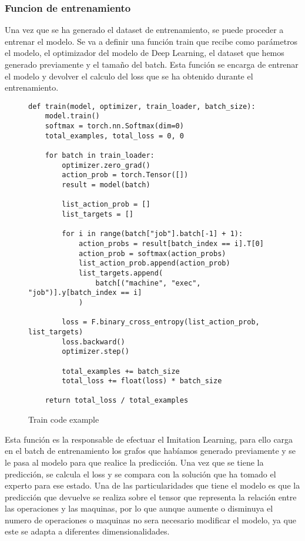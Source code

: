 \subsubsection{Funcion de entrenamiento}
Una vez que se ha generado el dataset de entrenamiento, se puede proceder a entrenar el modelo.
Se va a definir una función train que recibe como parámetros el modelo, el optimizador del modelo
de Deep Learning, el dataset
que hemos generado previamente y el tamaño del batch. Esta función se encarga de entrenar el modelo
y devolver el calculo del loss que se ha obtenido durante el entrenamiento.\medskip

\begin{figure}[ht]
\begin{lstlisting}
def train(model, optimizer, train_loader, batch_size):
    model.train()
    softmax = torch.nn.Softmax(dim=0)
    total_examples, total_loss = 0, 0

    for batch in train_loader:
        optimizer.zero_grad()
        action_prob = torch.Tensor([])
        result = model(batch)

        list_action_prob = []
        list_targets = []

        for i in range(batch["job"].batch[-1] + 1):
            action_probs = result[batch_index == i].T[0]
            action_prob = softmax(action_probs)
            list_action_prob.append(action_prob)
            list_targets.append(
                batch[("machine", "exec", "job")].y[batch_index == i]
            )

        loss = F.binary_cross_entropy(list_action_prob, list_targets)
        loss.backward()
        optimizer.step()

        total_examples += batch_size
        total_loss += float(loss) * batch_size

    return total_loss / total_examples 
\end{lstlisting}\medskip
    \caption{Train code example}
    \label{fig:traincode}
\end{figure}

Esta función es la responsable de efectuar el Imitation Learning, para ello carga en el
batch de entrenamiento los grafos que habíamos generado previamente y se le pasa al modelo para que
realice la predicción. Una vez que se tiene la predicción, se calcula el loss y se compara
con la solución que ha tomado el experto para ese estado. Una de las particularidades que
tiene el modelo es que la predicción que devuelve se realiza sobre el tensor que representa
la relación entre las operaciones y las maquinas, por lo que aunque aumente o disminuya 
el numero de operaciones o maquinas no sera necesario modificar el modelo, ya que este 
se adapta a diferentes dimensionalidades.

